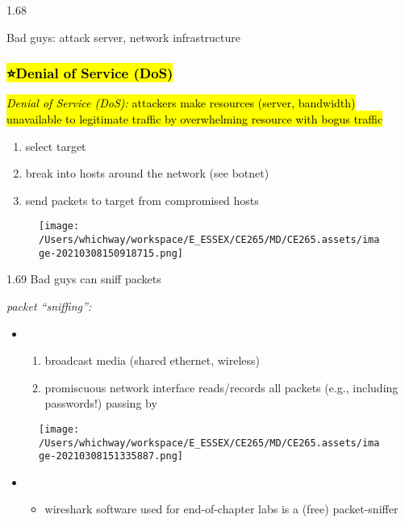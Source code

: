 \documentclass[
]{article}
\begin{document}
1.68

Bad guys: attack server, network infrastructure

\hypertarget{denial-of-service-dos}{%
\subsubsection{\texorpdfstring{\hl{⭐️Denial of Service
(DoS)}}{⭐️Denial of Service (DoS)}}\label{denial-of-service-dos}}

\hl{\emph{Denial of Service (DoS):} attackers make resources (server,
bandwidth) unavailable to legitimate traffic by overwhelming resource
with bogus traffic}

\begin{enumerate}
\def\labelenumi{\arabic{enumi}.}
\item
  select target
\item
  break into hosts around the network (see botnet)
\item
  send packets to target from compromised hosts
\end{enumerate}

\begin{figure}
\centering
\texttt{[image: /Users/whichway/workspace/E\_ESSEX/CE265/MD/CE265.assets/image-20210308150918715.png]}
\caption{}
\end{figure}

1.69 Bad guys can sniff packets

\emph{packet ``sniffing'':}

\begin{itemize}
\item
  \begin{enumerate}
  \def\labelenumi{\arabic{enumi}.}
  \item
    broadcast media (shared ethernet, wireless)
  \item
    promiscuous network interface reads/records all packets (e.g.,
    including passwords!) passing by
  \end{enumerate}
\end{itemize}

\begin{figure}
\centering
\texttt{[image: /Users/whichway/workspace/E\_ESSEX/CE265/MD/CE265.assets/image-20210308151335887.png]}
\caption{}
\end{figure}

\begin{itemize}
\item
  \begin{itemize}
  \item
    wireshark software used for end-of-chapter labs is a (free)
    packet-sniffer
  \end{itemize}
\end{itemize}
\end{document}
